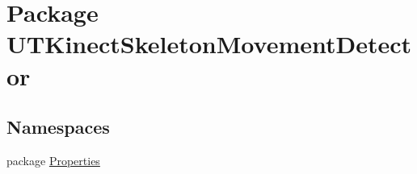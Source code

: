\hypertarget{namespace_u_t_kinect_skeleton_movement_detector}{\section{Package U\-T\-Kinect\-Skeleton\-Movement\-Detector}
\label{namespace_u_t_kinect_skeleton_movement_detector}
}
\subsection*{Namespaces}
\begin{DoxyCompactItemize}
\item 
package \hyperlink{namespace_u_t_kinect_skeleton_movement_detector_1_1_properties}{Properties}
\end{DoxyCompactItemize}
